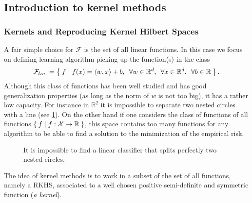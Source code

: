 \subsection{Introduction to kernel methods}\label{subsec:kernels}
\subsubsection{Kernels and Reproducing Kernel Hilbert Spaces}
A fair simple choice for $\mathcal{F}$ is the set of all linear functions. In
this case we focus on defining learning algorithm picking up the 
function(s) in the class
\begin{dmath*}
    \mathcal{F}_{lin.} = \Set{f | f(x) = \inner{w, x} + b, \enskip \forall w \in
    \mathbb{R}^d, \enskip \forall x \in \mathbb{R}^d, \enskip \forall b \in
    \mathbb{R}}.
\end{dmath*}
Although this class of functions has been well studied and has good
generalization properties (as long as the norm of $w$ is not too big), it has a
rather low capacity.  For instance in $\mathbb{R}^2$ it is impossible to
separate two nested circles with a line (see \cref{fig:nested_circle}). On the
other hand if one considers the class of functions of all functions $\Set{f |
f:\mathcal{X}\to\mathbb{R}}$, this space contains too many functions for any
algorithm to be able to find a solution to the minimization of the empirical
risk.
\begin{figure}
    \centering
    \caption[Separation of nested circles with linear classifier]{It is
    impossible to find a linear classifier that splits perfectly two nested
    circles.}
    \label{fig:nested_circle}
\end{figure}
The idea of kernel methods
\citep{Aronszajn1950,KIMELDORF1971,boser1992training,
Berlinet2003,Shawe-TaylorBook} is to work in a subset of the set of all
functions, namely a \acf{RKHS}, associated
to a well chosen positive semi-definite and symmetric function (\emph{a
kernel}).
